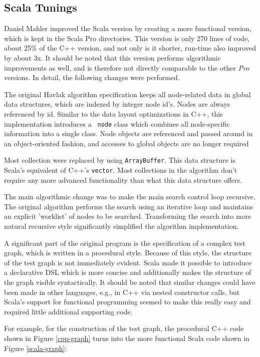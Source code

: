 \subsection{Scala Tunings}

Daniel Mahler improved the Scala version by creating a more functional
version, which is kept in the Scala Pro directories. This version is
only 270 lines of code, about 25\% of the C++ version, and not only is
it shorter, run-time also improved by about 3x. It should be noted
that this version performs algorithmic improvements as well, and
is therefore not directly comparable to the other {\em Pro} versions.
In detail, the following changes were performed.

The original Havlak algorithm specification keeps all node-related
data in global data structures, which are indexed by integer node id's.
Nodes are always referenced by id. Similar to the data
layout optimizations in C++, this implementation introduces a {\tt
  node} class which combines all node-specific information into a single
class. Node objects are referenced and passed around in an
object-oriented fashion, and accesses to global objects are no longer
required

Most collection were replaced by using {\tt ArrayBuffer}. This 
data structure is Scala's equivalent of C++'s {\tt vector}.
Most collections in the algorithm don't require any more advanced
functionality than what this data structure offers.

The main algorithmic change was to make the main 
search control loop recursive.
The original algorithm performs the search using an iterative loop
and maintains an explicit 'worklist' of nodes to be searched.
Transforming the search into more natural recursive style
significantly simplified the algorithm implementation.

A significant part of the original program is the specification of a
complex test graph, which is written in a procedural style.  Because
of this style, the structure of the test graph is not immediately evident.
Scala made it possible to introduce a declarative DSL which is more
concise and additionally makes the structure of the graph visible
syntactically.
It should be noted that similar changes could have been made in other
languages, e.g., in C++ via nested constructor calls, but Scala's
support for functional programming seemed to make this really easy
and required little additional supporting code.

For example, for the construction of the test graph, the 
procedural C++ code shown in Figure \ref{cpp-graph} turns into 
the more functional Scala code shown in Figure \ref{scala-graph}:

